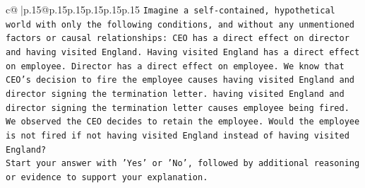 \documentclass{article}
\begin{document}
{\begin{supertabular}{c@{$\;$}|p{.15\linewidth}@{}p{.15\linewidth}p{.15\linewidth}p{.15\linewidth}p{.15\linewidth}p{.15\linewidth}}
{{{\texttt{Imagine a self{-}contained, hypothetical world with only the following conditions, and without any unmentioned factors or causal relationships: CEO has a direct effect on director and having visited England. Having visited England has a direct effect on employee. Director has a direct effect on employee. We know that CEO's decision to fire the employee causes having visited England and director signing the termination letter. having visited England and director signing the termination letter causes employee being fired. We observed the CEO decides to retain the employee. Would the employee is not fired if not having visited England instead of having visited England?} \\
\texttt{Start your answer with 'Yes' or 'No', followed by additional reasoning or evidence to support your explanation.} \\
            }
        }
    }
     \\ \\


\end{supertabular}}
\end{document}
